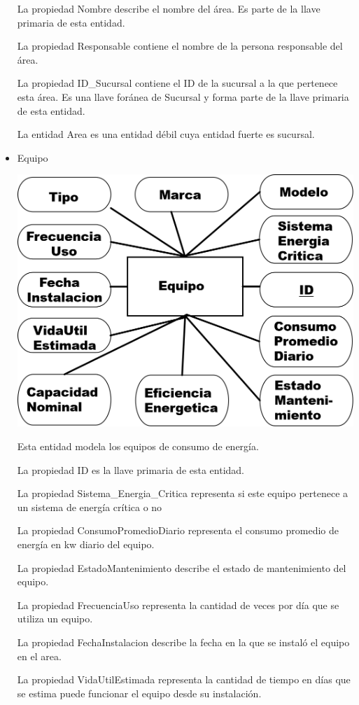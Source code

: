 \documentclass{article}
\begin{document}
\begin{itemize}
La propiedad Nombre describe el nombre del área. Es parte de la llave primaria de esta entidad.

La propiedad Responsable contiene el nombre de la persona responsable del área.

La propiedad ID\_Sucursal contiene el ID de la sucursal a la que pertenece esta área. Es una llave foránea  de Sucursal y forma parte de la llave primaria de esta entidad.

La entidad Area es una entidad débil cuya entidad fuerte es sucursal.
\item Equipo

\includegraphics[scale=0.5]{Imagenes/Informe1/EntidadEquipo.png}

Esta entidad modela los equipos de consumo de energía.

La propiedad ID es la llave primaria de esta entidad.

La propiedad Sistema\_Energia\_Critica representa si este equipo pertenece a un sistema de energía crítica o no

La propiedad ConsumoPromedioDiario representa el consumo promedio de energía en kw diario del equipo.

La propiedad EstadoMantenimiento describe el estado de mantenimiento del equipo.

La propiedad FrecuenciaUso representa la cantidad de veces por día que se utiliza un equipo.

La propiedad FechaInstalacion describe la fecha en la que se instaló el equipo en el area.

La propiedad VidaUtilEstimada representa la cantidad de tiempo en días que se estima puede funcionar el equipo desde su instalación.


\end{itemize}
\end{document}
